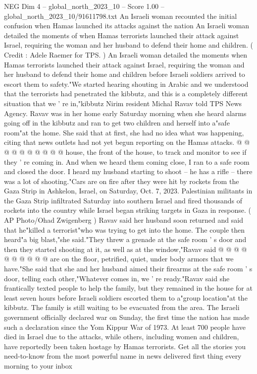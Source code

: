 \begin{textsample}{NEG Dim 4 – global\_north\_2023\_10 – Score 1.00 – global\_north\_2023\_10/91611798.txt}  \label{ex:f4_neg_003}
An Israeli woman recounted the initial confusion when Hamas launched its attacks against the nation An Israeli woman detailed the moments of when Hamas terrorists launched their attack against Israel, requiring the woman and her husband to defend their home and children. ( Credit : Adele Raemer for TPS. ) An Israeli woman detailed the moments when Hamas terrorists launched their attack against Israel, requiring the woman and her husband to defend their home and children before Israeli soldiers arrived to escort them to safety."We started hearing shouting in Arabic and we understood that the terrorists had penetrated the kibbutz, and this is a completely different situation that we ' re in,"kibbutz Nirim resident Michal Ravav told TPS News Agency.
Ravav was in her home early Saturday morning when she heard alarms going off in the kibbutz and ran to get two children and herself into a"safe room"at the home.
She said that at first, she had no idea what was happening, citing that news outlets had not yet begun reporting on the Hamas attacks. @ @ @ @ @ @ @ @ @ @ house, the front of the house, to track and monitor to see if they ' re coming in.
And when we heard them coming close, I ran to a safe room and closed the door.
I heard my husband starting to shoot -- he has a rifle -- there was a lot of shooting."Cars are on fire after they were hit by rockets from the Gaza Strip in Ashkelon, Israel, on Saturday, Oct. 7, 2023.
Palestinian militants in the Gaza Strip infiltrated Saturday into southern Israel and fired thousands of rockets into the country while Israel began striking targets in Gaza in response. ( AP Photo/Ohad Zwigenberg ) Ravav said her husband soon returned and said that he"killed a terrorist"who was trying to get into the home.
The couple then heard"a big blast,"she said."They threw a grenade at the safe room ' s door and then they started shooting at it, as well as at the window,"Ravav said @ @ @ @ @ @ @ @ @ @ are on the floor, petrified, quiet, under body armors that we have."She said that she and her husband aimed their firearms at the safe room ' s door, telling each other,"Whatever comes in, we ' re ready."Ravav said she frantically texted people to help the family, but they remained in the house for at least seven hours before Israeli soldiers escorted them to a"group location"at the kibbutz.
The family is still waiting to be evacuated from the area.
The Israeli government officially declared war on Sunday, the first time the nation has made such a declaration since the Yom Kippur War of 1973.
At least 700 people have died in Israel due to the attacks, while others, including women and children, have reportedly been taken hostage by Hamas terrorists.
Get all the stories you need-to-know from the most powerful name in news delivered first thing every morning to your inbox

\end{textsample}
